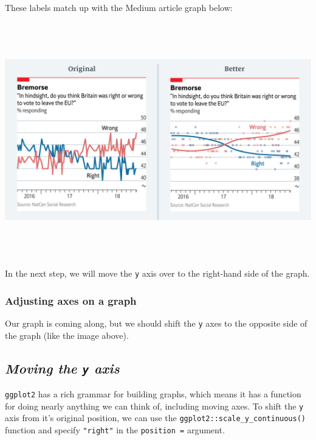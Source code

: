 \documentclass[letterpaper,12pt,twoside,]{pinp}
\begin{document}
These labels match up with the Medium article graph below:

\begin{center}\includegraphics[width=7in,height=4in]{../img/original-brexit} \end{center}

In the next step, we will move the \texttt{y} axis over to the
right-hand side of the graph.

\hypertarget{adjusting-axes-on-a-graph}{%
\subsubsection{Adjusting axes on a
graph}\label{adjusting-axes-on-a-graph}}

Our graph is coming along, but we should shift the \texttt{y} axes to
the opposite side of the graph (like the image above).

\hypertarget{moving-the-y-axis}{%
\subsection{\texorpdfstring{\textbf{\emph{Moving the \texttt{y}
axis}}}{Moving the y axis}}\label{moving-the-y-axis}}

\texttt{ggplot2} has a rich grammar for building graphs, which means it
has a function for doing nearly anything we can think of, including
moving axes. To shift the \texttt{y} axis from it's original position,
we can use the \texttt{ggplot2::scale\_y\_continuous()} function and
specify \texttt{"right"} in the \texttt{position\ =} argument.
\end{document}
